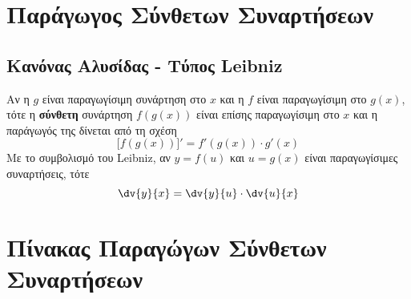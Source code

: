 \section*{Παράγωγος Σύνθετων Συναρτήσεων}

\subsection*{Κανόνας Αλυσίδας - Τύπος Leibniz}

\begin{prop}
  Αν η $g$ είναι παραγωγίσιμη συνάρτηση στο $x$ και η $f$ είναι παραγωγίσιμη στο $ g(x)
  $, τότε η \textbf{σύνθετη} συνάρτηση $ f(g(x)) $ είναι επίσης παραγωγίσιμη στο $x$ 
  και η παράγωγός της δίνεται από τη σχέση
  \begin{equation}\label{eq:chain}
    \bigl[f(g(x))\bigr]' = f'(g(x)) \cdot g'(x)
  \end{equation} 
  Με το συμβολισμό του Leibniz, αν $ y=f(u) $ και $ u=g(x) $ είναι παραγωγίσιμες
  συναρτήσεις, τότε 
  \begin{equation}\label{eq:leib}
    \dv{y}{x} = \dv{y}{u} \cdot \dv{u}{x} 
  \end{equation} 
\end{prop}

\section*{Πίνακας Παραγώγων Σύνθετων Συναρτήσεων}

